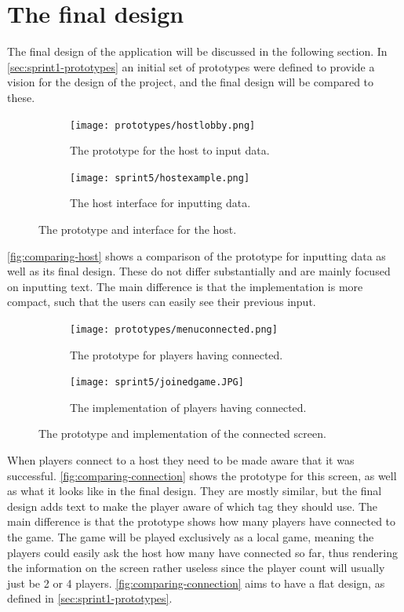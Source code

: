 \section{The final design}\label{sec:final-design}
The final design of the application will be discussed in the following section.
In \autoref{sec:sprint1-prototypes} an initial set of prototypes were defined to provide a vision for the design of the project, and the final design will be compared to these.
\begin{figure}[H]
    \centering
    \begin{subfigure}{0.45\textwidth}
        \centering
        \texttt{[image: prototypes/hostlobby.png]}
        \caption{The prototype for the host to input data.}
        \label{fig:host-prototype}
    \end{subfigure}
    \begin{subfigure}{0.45\textwidth}
        \centering
        \texttt{[image: sprint5/hostexample.png]}
        \caption{The host interface for inputting data.}
        \label{fig:host-interface}
    \end{subfigure}
    \caption{The prototype and interface for the host.}
    \label{fig:comparing-host}
\end{figure}
\noindent
\autoref{fig:comparing-host} shows a comparison of the prototype for inputting data as well as its final design.
These do not differ substantially and are mainly focused on inputting text.
The main difference is that the implementation is more compact, such that the users can easily see their previous input.

\begin{figure}[H]
    \centering
    \begin{subfigure}{0.45\textwidth}
        \centering
        \texttt{[image: prototypes/menuconnected.png]}
        \caption{The prototype for players having connected.}
        \label{fig:connected-prototype}
    \end{subfigure}
    \begin{subfigure}{0.45\textwidth}
        \centering
        \texttt{[image: sprint5/joinedgame.JPG]}
        \caption{The implementation of players having connected.}
        \label{fig:connected-implementation}
    \end{subfigure}
    \caption{The prototype and implementation of the connected screen.}
    \label{fig:comparing-connection}
\end{figure}
\noindent
When players connect to a host they need to be made aware that it was successful.
\autoref{fig:comparing-connection} shows the prototype for this screen, as well as what it looks like in the final design.
They are mostly similar, but the final design adds text to make the player aware of which tag they should use.
The main difference is that the prototype shows how many players have connected to the game.
The game will be played exclusively as a local game, meaning the players could easily ask the host how many have connected so far, thus rendering the information on the screen rather useless since the player count will usually just be 2 or 4 players.
\autoref{fig:comparing-connection} aims to have a flat design, as defined in \autoref{sec:sprint1-prototypes}.

